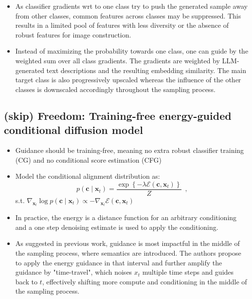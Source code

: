 \documentclass{article}
\begin{document}
\begin{itemize}
    \item As classifier gradients wrt to one class try to push the generated sample away from other classes, common features across classes may be suppressed. This results in a limited pool of features with less diversity or the absence of robust features for image construction. 
    \item Instead of maximizing the probability towards one class, one can guide by the weighted sum over all class gradients. The gradients are weighted by LLM-generated text descriptions and the resulting embedding similarity. The main target class is also progressively upscaled whereas the influence of the other classes is downscaled accordingly throughout the sampling process.
\end{itemize}

\subsection{(skip) Freedom: Training-free energy-guided conditional diffusion model}
\begin{itemize}
    \item Guidance should be training-free, meaning no extra robust classifier training (CG) and no conditional score estimation (CFG)
    \item Model the conditional alignment distribution as:
    $$
    p\left(\mathbf{c} \mid \mathbf{x}_t\right)=\frac{\exp \left\{-\lambda \mathcal{E}\left(\mathbf{c}, \mathbf{x}_t\right)\right\}}{Z}\enspace,
    $$
    s.t. $
    \nabla_{\mathbf{x}_t} \log p\left(\mathbf{c} \mid \mathbf{x}_t\right) \propto-\nabla_{\mathbf{x}_t} \mathcal{E}\left(\mathbf{c}, \mathbf{x}_t\right)
    $
    \item In practice, the energy is a distance function for an arbitrary conditioning and a one step denoising estimate is used to apply the conditioning. 
    \item As suggested in previous work, guidance is most impactful in the middle of the sampling process, where semantics are introduced. The authors propose to apply the energy guidance in that interval and further amplify the guidance by "time-travel", which noises $x_t$ multiple time steps and guides back to $t$, effectively shifting more compute and conditioning in the middle of the sampling process.
\end{itemize}
\end{document}
